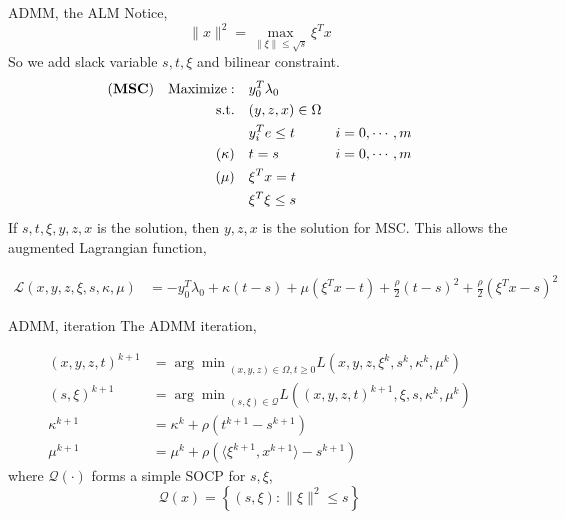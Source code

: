 \begin{frame}{ADMM, the ALM}
  Notice,
  \begin{equation}
    \|x\|^2 = \max_{\|\xi\| \le \sqrt s} \xi^T x
  \end{equation}
  So we add slack variable \(s, t, \xi\) and bilinear constraint.
  \begin{align}
    (\textbf{MSC}) \quad \mathrm{Maximize: }\quad & y_0 ^T\lambda_0                     \\
    \mathrm{s.t.} \quad                        & (y,z,x) \in \Omega                  \\
                                               & y_i^Te \le t       & i=0, \cdots, m \\
    (\kappa) \quad                             & t= s               & i=0, \cdots, m \\
    (\mu)    \quad                             & \xi^Tx = t                          \\
                                               & \xi^T\xi \le s
  \end{align}
  If \(s, t, \xi, y, z, x\) is the solution, then \( y, z, x\) is the solution for MSC.
  This allows the augmented Lagrangian function,

  \begin{align*}
    \mathscr L\left(x,y,z,\xi,s,\kappa,\mu\right) & = - y_0 ^T\lambda_0 + \kappa(t-s) + \mu(\xi^Tx - t) + \frac{\rho}{2}(t-s)^2 + \frac{\rho}{2}(\xi^Tx - s)^2
  \end{align*}
\end{frame}
\begin{frame}{ADMM, iteration}
  The ADMM iteration,

  \begin{align*}
    (x,y,z,t)^{k+1} & = {\arg\min}_{(x,y,z)\in\Omega, t\ge 0} L\left(x,y,z,\xi^k,s^k,\kappa^k,\mu^k\right)       \\
    (s, \xi)^{k+1}  & = {\arg\min}_{(s, \xi)\in\mathscr{Q}} L\left((x,y,z,t)^{k+1},\xi,s, \kappa^k, \mu^k\right) \\
    \kappa^{k+1}    & = \kappa^k + \rho\left(t^{k+1}-s^{k+1}\right)                                              \\
    \mu^{k+1}       & = \mu^k + \rho\left( \langle\xi^{k+1}, x^{k+1}\rangle - s^{k+1}\right)
  \end{align*}
  where \(\mathscr{Q(\cdot)}\) forms a simple SOCP for \(s, \xi\),
  \begin{equation}
    \mathscr{Q}(x) =\left\{(s,\xi): \|\xi\|^2 \le s\right\}
  \end{equation}
\end{frame}


